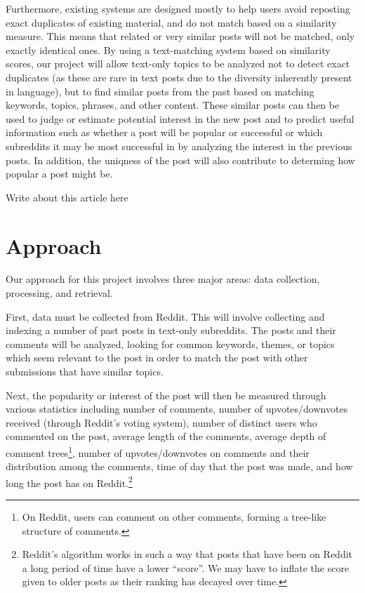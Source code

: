 \documentclass{acm_proc_article-sp}
\begin{document}
Furthermore, existing systems are designed mostly to help users avoid reposting exact duplicates of
existing material, and do not match based on a similarity measure.  This means that related or
very similar posts will not be matched, only exactly identical ones.  By using a text-matching system based
on similarity scores,
our project will allow text-only topics to be analyzed not to detect exact duplicates (as these
are rare in text posts due to the diversity inherently present in language), but to find similar
posts from the past based on matching keywords, topics, phrases, and other
content.  These similar posts can then be used to judge or estimate potential interest in the new
post and to predict useful information such as whether a post will be popular or successful or
which subreddits it may be most successful in by analyzing the interest in the previous posts. 
In addition, the uniqness of the post will also contribute to determing how popular a post might be.

Write about this article here \cite{liu:interest}

\vspace{10 mm}

\section{Approach}
Our approach for this project involves three major areas: data collection, processing, and retrieval.

First, data must be collected from Reddit.  This will involve collecting and indexing a number of past posts
in text-only subreddits.  The posts and their comments will be analyzed, looking for common keywords,
themes, or topics which seem relevant to the post in order to match the post with other submissions
that have similar topics.

Next, the popularity or interest of the post will then be measured through various statistics including
number of comments, number of upvotes/downvotes received (through Reddit's voting system), number
of distinct users who commented on the post, average length of the comments, average depth of
comment trees\footnote{On Reddit, users can comment on other comments, forming a tree-like structure of comments.},
number of upvotes/downvotes on comments and their distribution among the comments, time of day that the post was made,
and how long the post has on Reddit.\footnote{Reddit's algorithm works in such a way that posts that have been on Reddit
a long period of time have a lower ``score''. We may have to inflate the score given to older posts as their ranking
has decayed over time.}
\end{document}
